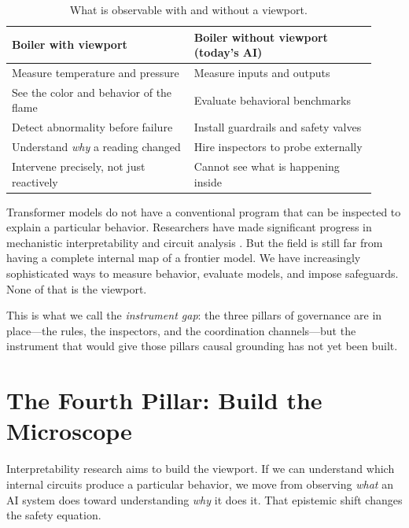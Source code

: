\documentclass[12pt]{article}
\begin{document}
\begin{table}[h]
\centering
\caption{What is observable with and without a viewport.}
\label{tab:boiler}
\begin{tabular}{p{0.46\linewidth}p{0.46\linewidth}}
\toprule
\textbf{Boiler with viewport} & \textbf{Boiler without viewport (today's AI)} \\
\midrule
Measure temperature and pressure & Measure inputs and outputs \\
See the color and behavior of the flame & Evaluate behavioral benchmarks \\
Detect abnormality before failure & Install guardrails and safety valves \\
Understand \emph{why} a reading changed & Hire inspectors to probe externally \\
Intervene precisely, not just reactively & Cannot see what is happening inside \\
\bottomrule
\end{tabular}
\end{table}

Transformer models do not have a conventional program that can be inspected
to explain a particular behavior. Researchers have made significant progress
in mechanistic interpretability and circuit analysis
\cite{elhage2021mathematical,olah2020zoom,conmy2023towards,lieberum2023does}.
But the field is still far from having a complete internal map of a frontier
model. We have increasingly sophisticated ways to measure behavior, evaluate
models, and impose safeguards. None of that is the viewport.

This is what we call the \emph{instrument gap}: the three pillars of
governance are in place---the rules, the inspectors, and the coordination
channels---but the instrument that would give those pillars causal grounding
has not yet been built.

\section{The Fourth Pillar: Build the Microscope}
\label{sec:fourth}

Interpretability research aims to build the viewport. If we can understand
which internal circuits produce a particular behavior, we move from observing
\emph{what} an AI system does toward understanding \emph{why} it does it.
That epistemic shift changes the safety equation.
\end{document}

